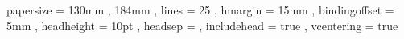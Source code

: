 \geometry
  {
	  papersize     = { 130mm , 184mm } ,
	  lines         = 25 ,
	  hmargin       = 15mm ,
	  bindingoffset = 5mm ,
	  headheight    = 10pt ,
	  headsep       = \baselineskip ,
	  includehead   = true ,
	  vcentering    = true
  }
